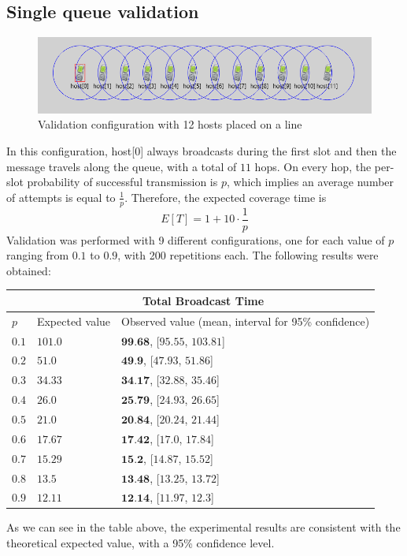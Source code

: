 \subsection{Single queue validation}
\begin{figure}[H]
    \begin{center}
        \includegraphics[scale=0.75]{img/singleQueueGUI.png}
        \caption{Validation configuration with 12 hosts placed on a line}
        \label{fig:single_queueGUI}
    \end{center}
    \vspace*{-0.8cm}
\end{figure}
In this configuration, host[0] always broadcasts during the first slot and then
the message travels along the queue, with a total of $11$ hops. On every hop,
the per-slot probability of successful transmission is $p$, which implies an
average number of attempts is equal to $\frac{1}{p}$. Therefore, the expected
coverage time is
\begin{equation}
    E[T] = 1 + 10 \cdot \frac{1}{p}
    \label{eq:singleQueueValidationAvgT}
\end{equation}
Validation was performed with 9 different configurations, one for  each value
of $p$ ranging from $0.1$ to $0.9$, with 200 repetitions each. The following
results were obtained:
\begin{center}
	\begin{tabular}{ | m{1cm} | m{5cm}| m{5cm} | }
		\hline
			&\multicolumn{2}{c}{Total Broadcast Time}\\
		\hline
			$p$& Expected value & Observed value (mean, interval for 95\% confidence)\\
		\hline
			$0.1$&$101.0$&$\textbf{99.68}$, [$95.55$, $103.81$]\\
		\hline
			$0.2$&$51.0$&$\textbf{49.9}$, [$47.93$, $51.86$]\\
		\hline
			$0.3$&$34.33$&$\textbf{34.17}$, [$32.88$, $35.46$]\\
		\hline
			$0.4$&$26.0$&$\textbf{25.79}$, [$24.93$, $26.65$]\\
		\hline
			$0.5$&$21.0$&$\textbf{20.84}$, [$20.24$, $21.44$]\\
		\hline
			$0.6$&$17.67$&$\textbf{17.42}$, [$17.0$, $17.84$]\\
		\hline
			$0.7$&$15.29$&$\textbf{15.2}$, [$14.87$, $15.52$]\\
		\hline
			$0.8$&$13.5$&$\textbf{13.48}$, [$13.25$, $13.72$]\\
		\hline
			$0.9$&$12.11$&$\textbf{12.14}$, [$11.97$, $12.3$]\\
		\hline
	\end{tabular}
\end{center}
As we can see in the table above, the experimental results are consistent with
the theoretical expected value, with a 95\% confidence level.

